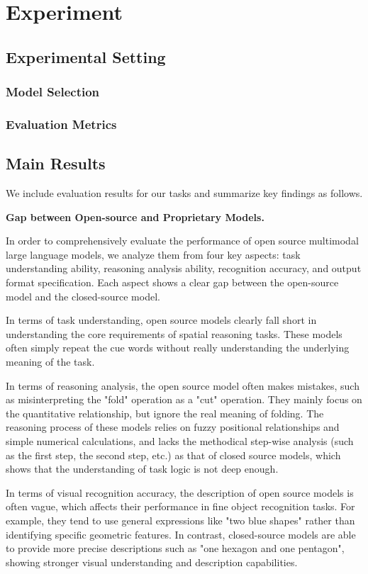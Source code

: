 \documentclass[letterpaper]{article} %
\begin{document}
\section{Experiment}
\subsection{Experimental Setting}
\subsubsection{Model Selection}
\subsubsection{Evaluation Metrics}

\subsection{Main Results}
We include evaluation results for our tasks and summarize key findings as follows.

\noindent \textbf{Gap between Open-source and Proprietary Models.}

In order to comprehensively evaluate the performance of open source multimodal large language models, we analyze them from four key aspects: task understanding ability, reasoning analysis ability, recognition accuracy, and output format specification. Each aspect shows a clear gap between the open-source model and the closed-source model.

In terms of task understanding, open source models clearly fall short in understanding the core requirements of spatial reasoning tasks. These models often simply repeat the cue words without really understanding the underlying meaning of the task.

In terms of reasoning analysis, the open source model often makes mistakes, such as misinterpreting the "fold" operation as a "cut" operation. They mainly focus on the quantitative relationship, but ignore the real meaning of folding. The reasoning process of these models relies on fuzzy positional relationships and simple numerical calculations, and lacks the methodical step-wise analysis (such as the first step, the second step, etc.) as that of closed source models, which shows that the understanding of task logic is not deep enough.

In terms of visual recognition accuracy, the description of open source models is often vague, which affects their performance in fine object recognition tasks. For example, they tend to use general expressions like "two blue shapes" rather than identifying specific geometric features. In contrast, closed-source models are able to provide more precise descriptions such as "one hexagon and one pentagon", showing stronger visual understanding and description capabilities.
\end{document}
